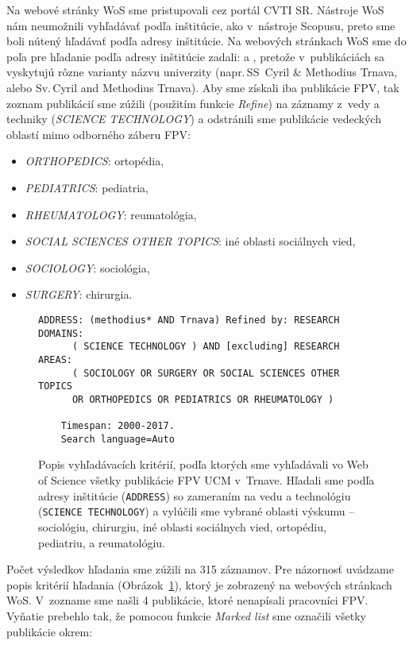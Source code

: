 Na webové stránky WoS sme pristupovali cez portál CVTI SR.  Nástroje WoS nám
neumožnili vyhľadávať podľa inštitúcie, ako v~nástroje Scopusu, preto sme boli
nútený hľadávať podľa adresy inštitúcie.  Na webových stránkach WoS sme do poľa
pre hľadanie podľa adresy inštitúcie zadali:  a ,
pretože v~publikáciách sa vyskytujú rôzne varianty názvu univerzity
(napr.\,SS~Cyril \& Methodius Trnava, alebo Sv.\,Cyril and Methodius Trnava).
Aby sme získali iba publikácie FPV, tak zoznam publikácií sme zúžili (použitím
funkcie \emph{Refine}) na záznamy z~vedy a techniky (\emph{SCIENCE TECHNOLOGY})
a odstránili sme publikácie vedeckých oblastí mimo odborného záberu FPV:

\begin{itemize}
\item \emph{ORTHOPEDICS}: ortopédia,
\item \emph{PEDIATRICS}: pediatria,
\item \emph{RHEUMATOLOGY}: reumatológia,
\item \emph{SOCIAL SCIENCES OTHER TOPICS}: iné oblasti sociálnych vied,
\item \emph{SOCIOLOGY}: sociológia,
\item \emph{SURGERY}: chirurgia.
\end{itemize}

\begin{figure}
  \footnotesize
  \begin{Verbatim}[frame=single]
    ADDRESS: (methodius* AND Trnava) Refined by: RESEARCH DOMAINS:
      ( SCIENCE TECHNOLOGY ) AND [excluding] RESEARCH AREAS:
      ( SOCIOLOGY OR SURGERY OR SOCIAL SCIENCES OTHER TOPICS
      OR ORTHOPEDICS OR PEDIATRICS OR RHEUMATOLOGY )

    Timespan: 2000-2017.
    Search language=Auto
  \end{Verbatim}
  \vspace*{-4mm}
  \caption[Popis kritérií vyhľadávania vo WoS pre FPV]%
  {Popis vyhľadávacích kritérií, podľa ktorých sme vyhľadávali vo Web of Science
    všetky publikácie FPV UCM v~Trnave.  Hľadali sme podľa adresy inštitúcie
    (\texttt{ADDRESS}) so zameraním na vedu a technológiu (\texttt{SCIENCE
      TECHNOLOGY}) a vylúčili sme vybrané oblasti výskumu -- sociológiu,
    chirurgiu, iné oblasti sociálnych vied, ortopédiu, pediatriu, a
    reumatológiu.}
  \label{fig:wos.query}
\end{figure}


Počet výsledkov hľadania sme zúžili na 315 záznamov.  Pre názornosť uvádzame
popis kritérií hľadania (Obrázok~\ref{fig:wos.query}), ktorý je zobrazený na
webových stránkach WoS.  V~zozname sme našli 4 publikácie, ktoré nenapísali
pracovníci FPV.  Vyňatie prebehlo tak, že pomocou funkcie \emph{Marked list} sme
označili všetky publikácie okrem:


